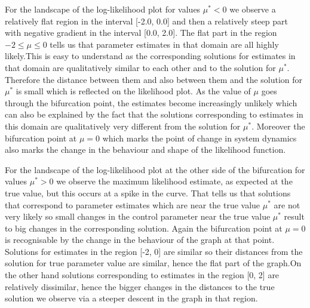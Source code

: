For the landscape of the log-likelihood plot for values $\mu^* < 0$ we observe a relatively flat region in the interval [-2.0, 0.0] and then a relatively steep part with negative gradient in the interval [0.0, 2.0]. The flat part in the region $-2 \le \mu \le 0$ tells us that parameter estimates in that domain are all highly likely.This is easy to understand as the corresponding solutions for estimates in that domain  are qualitatively similar to each other and to the solution for $\mu^*$. Therefore the distance between them and also between them and the solution for $\mu^*$ is small which is reflected on the likelihood plot. As the value of $\mu$ goes through the bifurcation point, the estimates become increasingly unlikely which can also be explained by the fact that the solutions corresponding to estimates in this domain are qualitatively very different from the solution for $\mu^*$. Moreover the bifurcation point at $\mu = 0$ which marks the point of change in system dynamics also marks the change in the behaviour and shape of the likelihood function.

For the landscape of the log-likelihood plot at the other side of the bifurcation for values $\mu^* > 0$ we observe the maximum likelihood estimate, as expected at the true value, but this occurs at a spike in the curve. That tells us that solutions that correspond to parameter estimates which are near the true value $\mu^*$ are not very likely so small changes in the control parameter near the true value $\mu^*$ result to big changes in the corresponding solution. Again the bifurcation point at $\mu=0$ is recognisable by the change in the behaviour of the graph at that point. Solutions for estimates in the region [-2, 0] are similar so their distances from the solution for true parameter value are similar, hence the flat part of the graph.On the other hand solutions corresponding to estimates in the region [0, 2] are relatively dissimilar, hence the bigger changes in the distances to the true solution we observe via a steeper descent in the graph in that region.


